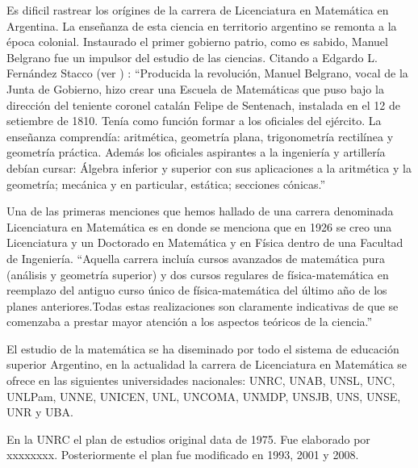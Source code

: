 \documentclass[a4paper, 12pt]{article}
\begin{document}
Es dificil rastrear los orígines de la carrera de Licenciatura en Matemática en Argentina. La enseñanza de esta ciencia en territorio argentino se remonta a la  época colonial. Instaurado el primer gobierno patrio, como es sabido, Manuel Belgrano fue un impulsor del estudio de las ciencias. Citando a Edgardo L. Fernández Stacco
 (ver \cite{stacco2011200})
 : ``Producida la revolución, Manuel Belgrano, vocal de la Junta de Gobierno, hizo
crear una Escuela de Matemáticas que puso bajo la dirección del teniente coronel
catalán Felipe de Sentenach, instalada en el 12 de setiembre de 1810. Tenía como
función formar a los oficiales del ejército.
La enseñanza comprendía: aritmética, geometría plana, trigonometría rectilínea
y geometría práctica. Además los oficiales aspirantes a la ingeniería y artillería debían
cursar: Álgebra inferior y superior con sus aplicaciones a la aritmética y la geometría;
mecánica y en particular, estática; secciones cónicas.''

 Una de las primeras menciones que hemos hallado de una carrera denominada Licenciatura en Matemática es en  \cite{ortiz2011julio} 
 donde se menciona que en  1926 se creo una Licenciatura y un Doctorado en Matemática y en Física dentro de una Facultad de Ingeniería. ``Aquella carrera incluía cursos avanzados de matemática pura (análisis y geometría superior) y dos cursos regulares de física-matemática en reemplazo del antiguo curso único de física-matemática del último año de los planes anteriores.Todas estas realizaciones son claramente indicativas de que se comenzaba a prestar mayor  atención a los aspectos teóricos de la ciencia.''

 El estudio de la matemática se ha diseminado por todo el sistema de educación superior Argentino, en la actualidad la carrera de Licenciatura en Matemática se ofrece en las siguientes universidades nacionales: UNRC, UNAB, UNSL, UNC, UNLPam, UNNE, UNICEN, UNL, UNCOMA, UNMDP, UNSJB, UNS, UNSE, UNR y UBA.  
 
 En la UNRC el plan de estudios original data de 1975. Fue elaborado por xxxxxxxx. Posteriormente el plan fue modificado en 1993, 2001 y 2008.  
 
 
 
\end{document}
